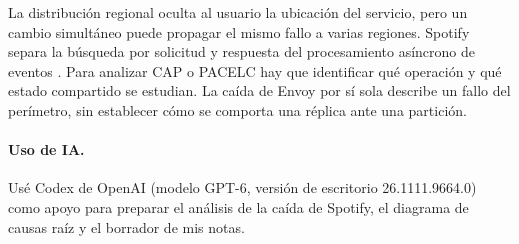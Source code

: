 La distribución regional oculta al usuario la ubicación del servicio, pero
un cambio simultáneo puede propagar el mismo fallo a varias regiones.
Spotify separa la búsqueda por solicitud y respuesta del procesamiento
asíncrono de eventos \cite{spotifyIncident2025,spotifyWebApiSearch,khlebnikova2024dataplatform}.
Para analizar CAP o PACELC hay que identificar qué operación y qué estado
compartido se estudian. La caída de Envoy por sí sola describe un fallo del
perímetro, sin establecer cómo se comporta una réplica ante una partición.

\paragraph{Uso de IA.}
Usé Codex de OpenAI (modelo GPT-6, versión de escritorio 26.1111.9664.0)
como apoyo para preparar el análisis de la caída de Spotify, el diagrama
de causas raíz y el borrador de mis notas.
